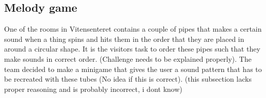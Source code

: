 \subsection{Melody game}
One of the rooms in Vitensenteret contains a couple of pipes that makes a certain sound when a thing spins and hits them in the order that they are placed in around a circular shape. It is the visitors task to order these pipes such that they make sounds in correct order. (Challenge needs to be explained properly). The team decided to make a minigame that gives the user a sound pattern that has to be recreated with these tubes (No idea if this is correct). (this subsection lacks proper reasoning and is probably incorrect, i dont know)

